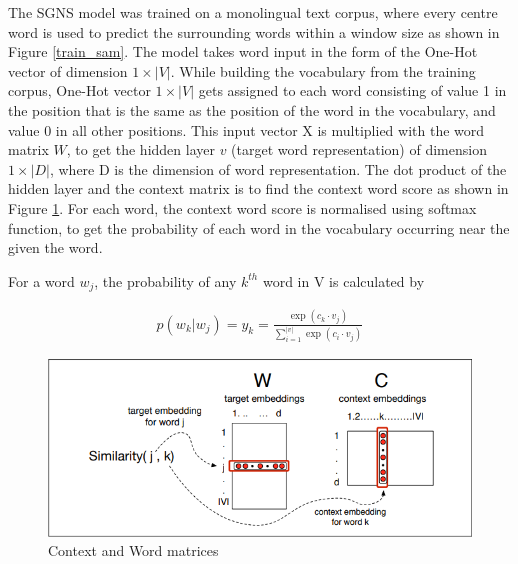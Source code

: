 \documentclass[12pt]{report} %
\begin{document}


The SGNS model was trained on a monolingual text corpus, where every centre word is used to predict the surrounding words within a window size as shown in Figure \ref{train_sam}.
The model takes word input in the form of the One-Hot vector of dimension $1\times|V|$. While building the vocabulary from the training corpus, One-Hot vector $1\times|V|$ gets assigned to each word consisting of value 1 in the position that is the same as the position of the word in the vocabulary, and value 0 in all other positions. This input vector X is multiplied with the word matrix $W$, to get the hidden layer $v$ (target word representation) of dimension $1\times|D|$, where D is the dimension of word representation. The dot product of the hidden layer and the context matrix is to find the context word score as shown in Figure \ref{C_W_matrics}. For each word, the context word score is normalised using softmax function, to get the probability of each word in the vocabulary occurring near the given the word. 



For a word $w_{j}$, the probability of any $k^{th}$ word in V is calculated by

\begin{align}
p(w_{k} | w_{j}) = y_{k} = \frac{\exp( c_{k} \cdot v_{j})}{\sum_{i=1}^{|v|} \exp(c_{i} \cdot v_{j}) }
\end{align}

\begin{figure}[!tbp]
	\centering
	\includegraphics[scale=0.50]{image/cbows.png}
	\caption{Context and Word matrices \citep{jurafsky2014speech}}
	\label{C_W_matrics}
\end{figure}
\end{document}
